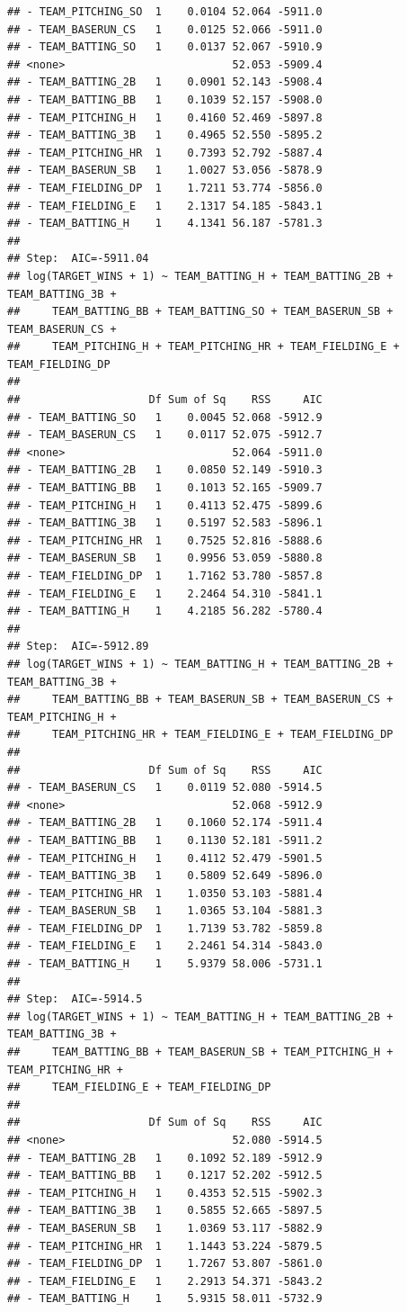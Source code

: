 \documentclass[
]{article}
\begin{document}
\begin{verbatim}
## - TEAM_PITCHING_SO  1    0.0104 52.064 -5911.0
## - TEAM_BASERUN_CS   1    0.0125 52.066 -5911.0
## - TEAM_BATTING_SO   1    0.0137 52.067 -5910.9
## <none>                          52.053 -5909.4
## - TEAM_BATTING_2B   1    0.0901 52.143 -5908.4
## - TEAM_BATTING_BB   1    0.1039 52.157 -5908.0
## - TEAM_PITCHING_H   1    0.4160 52.469 -5897.8
## - TEAM_BATTING_3B   1    0.4965 52.550 -5895.2
## - TEAM_PITCHING_HR  1    0.7393 52.792 -5887.4
## - TEAM_BASERUN_SB   1    1.0027 53.056 -5878.9
## - TEAM_FIELDING_DP  1    1.7211 53.774 -5856.0
## - TEAM_FIELDING_E   1    2.1317 54.185 -5843.1
## - TEAM_BATTING_H    1    4.1341 56.187 -5781.3
## 
## Step:  AIC=-5911.04
## log(TARGET_WINS + 1) ~ TEAM_BATTING_H + TEAM_BATTING_2B + TEAM_BATTING_3B + 
##     TEAM_BATTING_BB + TEAM_BATTING_SO + TEAM_BASERUN_SB + TEAM_BASERUN_CS + 
##     TEAM_PITCHING_H + TEAM_PITCHING_HR + TEAM_FIELDING_E + TEAM_FIELDING_DP
## 
##                    Df Sum of Sq    RSS     AIC
## - TEAM_BATTING_SO   1    0.0045 52.068 -5912.9
## - TEAM_BASERUN_CS   1    0.0117 52.075 -5912.7
## <none>                          52.064 -5911.0
## - TEAM_BATTING_2B   1    0.0850 52.149 -5910.3
## - TEAM_BATTING_BB   1    0.1013 52.165 -5909.7
## - TEAM_PITCHING_H   1    0.4113 52.475 -5899.6
## - TEAM_BATTING_3B   1    0.5197 52.583 -5896.1
## - TEAM_PITCHING_HR  1    0.7525 52.816 -5888.6
## - TEAM_BASERUN_SB   1    0.9956 53.059 -5880.8
## - TEAM_FIELDING_DP  1    1.7162 53.780 -5857.8
## - TEAM_FIELDING_E   1    2.2464 54.310 -5841.1
## - TEAM_BATTING_H    1    4.2185 56.282 -5780.4
## 
## Step:  AIC=-5912.89
## log(TARGET_WINS + 1) ~ TEAM_BATTING_H + TEAM_BATTING_2B + TEAM_BATTING_3B + 
##     TEAM_BATTING_BB + TEAM_BASERUN_SB + TEAM_BASERUN_CS + TEAM_PITCHING_H + 
##     TEAM_PITCHING_HR + TEAM_FIELDING_E + TEAM_FIELDING_DP
## 
##                    Df Sum of Sq    RSS     AIC
## - TEAM_BASERUN_CS   1    0.0119 52.080 -5914.5
## <none>                          52.068 -5912.9
## - TEAM_BATTING_2B   1    0.1060 52.174 -5911.4
## - TEAM_BATTING_BB   1    0.1130 52.181 -5911.2
## - TEAM_PITCHING_H   1    0.4112 52.479 -5901.5
## - TEAM_BATTING_3B   1    0.5809 52.649 -5896.0
## - TEAM_PITCHING_HR  1    1.0350 53.103 -5881.4
## - TEAM_BASERUN_SB   1    1.0365 53.104 -5881.3
## - TEAM_FIELDING_DP  1    1.7139 53.782 -5859.8
## - TEAM_FIELDING_E   1    2.2461 54.314 -5843.0
## - TEAM_BATTING_H    1    5.9379 58.006 -5731.1
## 
## Step:  AIC=-5914.5
## log(TARGET_WINS + 1) ~ TEAM_BATTING_H + TEAM_BATTING_2B + TEAM_BATTING_3B + 
##     TEAM_BATTING_BB + TEAM_BASERUN_SB + TEAM_PITCHING_H + TEAM_PITCHING_HR + 
##     TEAM_FIELDING_E + TEAM_FIELDING_DP
## 
##                    Df Sum of Sq    RSS     AIC
## <none>                          52.080 -5914.5
## - TEAM_BATTING_2B   1    0.1092 52.189 -5912.9
## - TEAM_BATTING_BB   1    0.1217 52.202 -5912.5
## - TEAM_PITCHING_H   1    0.4353 52.515 -5902.3
## - TEAM_BATTING_3B   1    0.5855 52.665 -5897.5
## - TEAM_BASERUN_SB   1    1.0369 53.117 -5882.9
## - TEAM_PITCHING_HR  1    1.1443 53.224 -5879.5
## - TEAM_FIELDING_DP  1    1.7267 53.807 -5861.0
## - TEAM_FIELDING_E   1    2.2913 54.371 -5843.2
## - TEAM_BATTING_H    1    5.9315 58.011 -5732.9
\end{verbatim}
\end{document}
